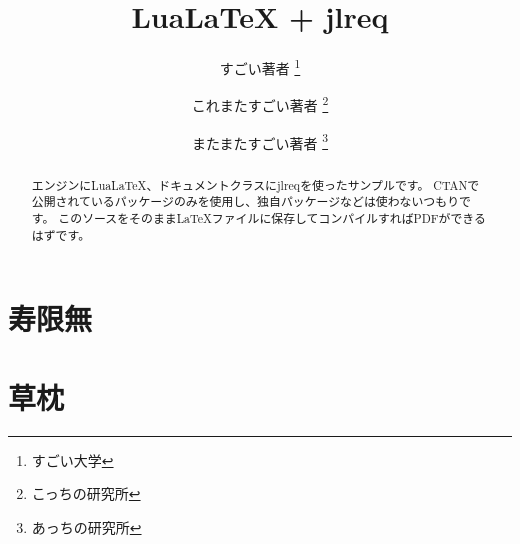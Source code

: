 \documentclass[article, head_space=25truemm, foot_space=15truemm, gutter=15truemm]{jlreq}
\title{LuaLaTeX + jlreq}
\author{
    すごい著者 \thanks{すごい大学} \\ \and
    これまたすごい著者 \thanks{こっちの研究所} \\ \and
    またまたすごい著者 \thanks{あっちの研究所}
}
\begin{document}
\maketitle

\begin{abstract}
エンジンにLuaLaTeX、ドキュメントクラスにjlreqを使ったサンプルです。
CTANで公開されているパッケージのみを使用し、独自パッケージなどは使わないつもりです。
このソースをそのままLaTeXファイルに保存してコンパイルすればPDFができるはずです。
\end{abstract}

\section{寿限無}


\section{草枕}


\newpage
\layout

\printbibliography[title={参考文献}]
\end{document}
